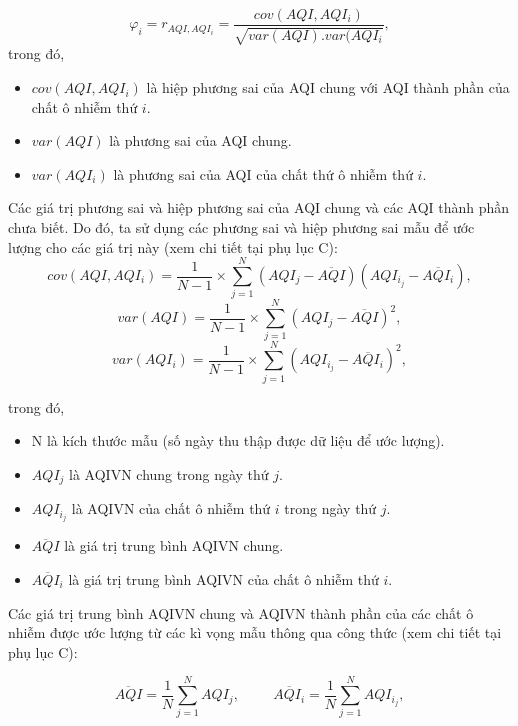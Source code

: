 \documentclass[14pt]{extreport}
\theoremstyle{definition}
\theoremstyle{plain}
\theoremstyle{remark}
\begin{document}
\begin{equation}
\varphi_i = r_{AQI,AQI_i} = \dfrac{cov(AQI, AQI_i)}{\sqrt{var(AQI).var(AQI_i}},
\end{equation}
trong đó, 
\begin{itemize}
\item $cov(AQI,AQI_i)$ là hiệp phương sai của AQI chung với AQI thành phần của chất ô nhiễm thứ $i$.
\item $var(AQI)$ là phương sai của AQI chung.
\item $var(AQI_i)$ là phương sai của AQI của chất thứ ô nhiễm thứ $i$.
\end{itemize}

Các giá trị phương sai và hiệp phương sai của AQI chung và các AQI thành phần chưa biết. Do đó, ta sử dụng các phương sai và hiệp phương sai mẫu để ước lượng cho các giá trị này (xem chi tiết tại phụ lục C):
\begin{equation}
cov(AQI,AQI_i) = \dfrac{1}{N-1}\times \sum_{j=1}^N \left(AQI_j - \overline{AQI} \right)\left(AQI_{i_j} - \overline{AQI_i}\right),
\end{equation}
\begin{equation}
var(AQI) = \dfrac{1}{N-1}\times \sum_{j=1}^N \left(AQI_j - \overline{AQI}\right)^2,
\end{equation}
\begin{equation}
var(AQI_i) = \dfrac{1}{N-1}\times \sum_{j=1}^N\left(AQI_{i_j} - \overline{AQI_i}\right)^2,
\end{equation}

trong đó,
\begin{itemize}
\item N là kích thước mẫu (số ngày thu thập được dữ liệu để ước lượng).
\item $AQI_j$ là AQIVN chung trong ngày thứ $j$.
\item $AQI_{i_j}$ là AQIVN của chất ô nhiễm thứ $i$ trong ngày thứ $j$.
\item $\overline{AQI}$ là giá trị trung bình AQIVN chung.
\item $\overline{AQI_i}$ là giá trị trung bình AQIVN của chất ô nhiễm thứ $i$.
\end{itemize}

Các giá trị trung bình AQIVN chung và AQIVN thành phần của các chất ô nhiễm được ước lượng từ các kì vọng mẫu thông qua công thức (xem chi tiết tại phụ lục C):

\begin{equation}
\overline{AQI} = \dfrac{1}{N} \sum_{j=1}^N AQI_j,\hspace{1cm}
\overline{AQI_i} = \dfrac{1}{N} \sum_{j=1}^N AQI_{i_j},
\end{equation}
\end{document}
